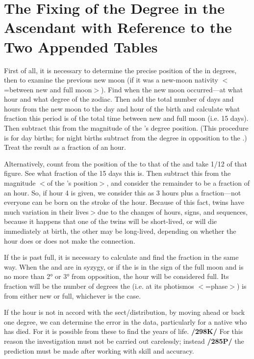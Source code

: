 \section{The Fixing of the Degree in the Ascendant with Reference to the Two Appended Tables}

First of all, it is necessary to determine the precise position of the \Sun\xspace in degrees, then to examine the previous new moon (if it was a new-moon nativity $<$=between new and full moon$>$). Find when the new moon occurred—at what hour and what degree of the zodiac. Then add the total number of days and hours from the new moon to the day and hour of the birth and calculate what fraction this period is of the total time between new and full moon (i.e. 15 days). Then subtract this from the magnitude of the \Sun’s degree position. (This procedure is for day births; for night births subtract from the degree in opposition to the \Sun.) Treat the result as a fraction of an hour.

Alternatively, count from the position of the \Sun\xspace to that of the \Moon\xspace and take 1/12 of that figure. See what fraction of the 15 days this is. Then subtract this from the magnitude $<$of the \Sun’s position$>$, and consider the remainder to be a fraction of an hour. So, if hour 4 is given, we consider this as 3 hours plus a fraction—not everyone can be born on the stroke of the hour. Because of this fact, twins have much variation in their lives$>$due to the changes of hours, signs, and sequences, because it happens that one of the twins will be short-lived, or will die immediately at birth, the other may be long-lived, depending on whether the hour does or does not make the connection.

If the \Moon\xspace is past full, it is necessary to calculate and find the fraction in the same way. When the \Sun\xspace and \Moon\xspace are in syzygy, or if the \Moon\xspace is in the sign of the full moon and is no more than 2° or 3° from opposition, the hour will be considered full. Its fraction will be the number of degrees the \Moon\xspace (i.e.
at its photismos $<$=phase$>$) is from either new or full, whichever is the case. 

If the hour is not in accord with the sect/distribution, by moving ahead or back one degree, we can determine the error in the data, particularly for a native who has died. For it is possible from these to find the years of life. \textbf{/298K/} For this reason the investigation must not be carried out carelessly; instead \textbf{/285P/} the prediction must be made after working with skill and accuracy. 

